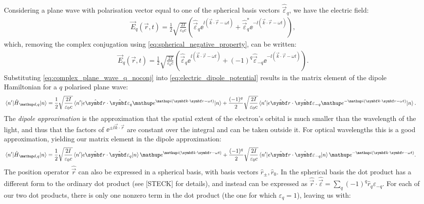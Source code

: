 Considering a plane wave with polarisation vector equal to one of the spherical basis vectors $\hat{\vec\varepsilon}_q$, we have the electric field:
\begin{align}\label{eq:complex_plane_wave_q}
\vec E_q(\vec r, t) = \frac12\sqrt{\frac{2I}{\varepsilon_0 c}}
\left(\hat{\vec\varepsilon}_q \ee^{\ii(\vec k \cdot \vec r - \omega t)}
+ \hat{\vec\varepsilon}_q^* \ee^{-\ii(\vec k \cdot \vec r - \omega t)} \right),
\end{align}
which, removing the complex conjugation using \eqref{eq:spherical_negative_property}, can be written:
\begin{align}\label{eq:complex_plane_wave_q_noconj}
\vec E_q(\vec r, t) = \frac12\sqrt{\frac{2I}{\varepsilon_0 c}}
\left(\hat{\vec\varepsilon}_q \ee^{\ii(\vec k \cdot \vec r - \omega t)}
+ (-1)^q\hat{\vec\varepsilon}_{-q} \ee^{-\ii(\vec k \cdot \vec r - \omega t)} \right).
\end{align}
Substituting \eqref{eq:complex_plane_wave_q_noconj} into \eqref{eq:electric_dipole_potential} results in the matrix element of the dipole Hamiltonian for a $q$ polarised plane wave:
\begin{align}
\matrixel{n^\prime}{\hat H_{\up{d},q}}{n} &= 
\frac12\sqrt{\frac{2I}{\varepsilon_0 c}}
\matrixel{n^\prime}
  {e\hat{\vec r}\cdot\hat{\vec\varepsilon}_q \ee^{\ii(\vec k \cdot \vec r - \omega t)}}
  {n}
+\frac{(-1)^q}2\sqrt{\frac{2I}{\varepsilon_0 c}}
\matrixel{n^\prime}
  {e\hat{\vec r}\cdot\hat{\vec\varepsilon}_{-q} \ee^{-\ii(\vec k \cdot \vec r - \omega t)}}
  {n}.
\end{align}
The \emph{dipole approximation} is the approximation that the spatial extent of the electron's orbital is much smaller than the wavelength of the light, and thus that the factors of $\ee^{\pm\ii\vec k\cdot\vec r}$ are constant over the integral and can be taken outside it. For optical wavelengths this is a good approximation, yielding our matrix element in the dipole approximation:
\begin{align}
\matrixel{n^\prime}{\hat H_{\up{d},q}}{n} &= 
\frac12\sqrt{\frac{2I}{\varepsilon_0 c}}
\matrixel{n^\prime}
  {e\hat{\vec r}\cdot\hat{\vec\varepsilon}_q}
  {n}\ee^{\ii(\vec k \cdot \vec r - \omega t)}
+\frac{(-1)^q}2\sqrt{\frac{2I}{\varepsilon_0 c}}
\matrixel{n^\prime}
  {e\hat{\vec r}\cdot\hat{\vec\varepsilon}_{-q}}
  {n} \ee^{-\ii(\vec k \cdot \vec r - \omega t)}.
\end{align}
The position operator $\hat{\vec r}$ can also be expressed in a spherical basis, with basis vectors $\hat r_{\pm},\hat r_0$. In the spherical basis the dot product has a different form to the ordinary dot product (see [STECK] for details), and instead can be expressed as $\hat {\vec r}\cdot\hat{\vec\varepsilon} = \sum_q(-1)^q \hat r_q \varepsilon_{-q}$. For each of our two dot products, there is only one nonzero term in the dot product (the one for which $\varepsilon_q=1$), leaving us with:
